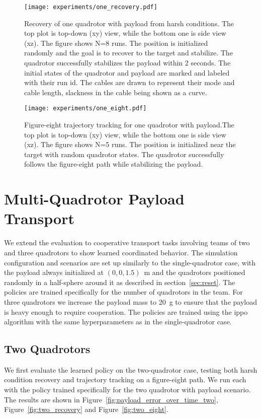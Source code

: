 \begin{figure}[H]
    \centering
    
    \texttt{[image: experiments/one\_recovery.pdf]}
    \caption[Single quadrotor harsh recovery trajectory]{Recovery of one quadrotor with payload from harsh conditions. The top plot is top-down  (xy) view, while the bottom one is side view (xz).
    The figure shows N=8 runs. The position is initialized randomly and the goal is to recover to the target and stabilize. The quadrotor successfully stabilizes the payload within 2 seconds. The initial states of the quadrotor and payload are marked and labeled with their run id. The cables are drawn to represent their mode and cable length, slackness in the cable being shown as a curve.}
    \label{fig:one_recovery}
\end{figure}
\begin{figure}[H]
    \centering
    
    \texttt{[image: experiments/one\_eight.pdf]}
    \caption[Single quadrotor figure-eight tracking]{Figure-eight trajectory tracking for one quadrotor with payload.The top plot is top-down  (xy) view, while the bottom one is side view (xz). The figure shows N=5 runs. The position is initialized near the target with random quadrotor states. The quadrotor successfully follows the figure-eight path while stabilizing the payload.}
    \label{fig:one_eight}
\end{figure}

\section{Multi-Quadrotor Payload Transport}
We extend the evaluation to cooperative transport tasks involving teams of two and three quadrotors to show learned coordinated behavior. The simulation configuration and scenarios are set up similarly to the single-quadrotor case, with the payload always initialized at $(0,0,1.5)$~m and the quadrotors positioned randomly in a half-sphere around it as described in section~\ref{sec:reset}. The policies are trained specifically for the number of quadrotors in the team. For three quadrotors we increase the payload mass to 20~g to ensure that the payload is heavy enough to require cooperation. The policies are trained using the \gls{ippo} algorithm with the same hyperparameters as in the single-quadrotor case.

\subsection{Two Quadrotors}
We first evaluate the learned policy on the two-quadrotor case, testing both harsh condition recovery and trajectory tracking on a figure-eight path. We run each with the policy trained specifically for the two quadrotor with payload scenario. The results are shown in Figure~\ref{fig:payload_error_over_time_two}, Figure~\ref{fig:two_recovery} and Figure~\ref{fig:two_eight}.

